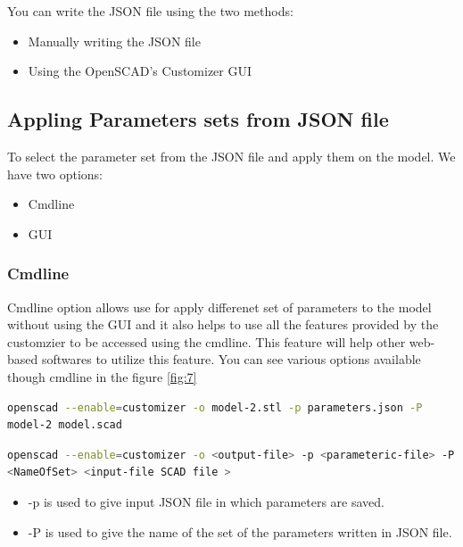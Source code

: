 You can write the JSON file using the two methods:
\begin{itemize}
    \item Manually writing the JSON file
    \item Using the OpenSCAD's Customizer GUI
\end{itemize}

\subsection{Appling Parameters sets from JSON file}
To select the parameter set from the JSON file and apply them on the model. We have two options:

\begin{itemize}
    \item Cmdline
    \item GUI
\end{itemize}

\subsubsection{Cmdline}
Cmdline option allows use for apply differenet set of parameters to the model without using the GUI and it also helps to use all the features provided by the customzier to be accessed using the cmdline. This feature will help other web-based softwares to utilize this feature. You can see various options available though cmdline in the figure \ref{fig:7}
 
\begin{lstlisting}[language=bash]
openscad --enable=customizer -o model-2.stl -p parameters.json -P 
model-2 model.scad
\end{lstlisting}

\begin{lstlisting}[language=bash]
openscad --enable=customizer -o <output-file> -p <parameteric-file> -P 
<NameOfSet> <input-file SCAD file >\end{lstlisting}

\begin{itemize}
    \item -p is used to give input JSON file in which parameters are saved.
    \item -P is used to give the name of the set of the parameters written in JSON file.
\end{itemize}

